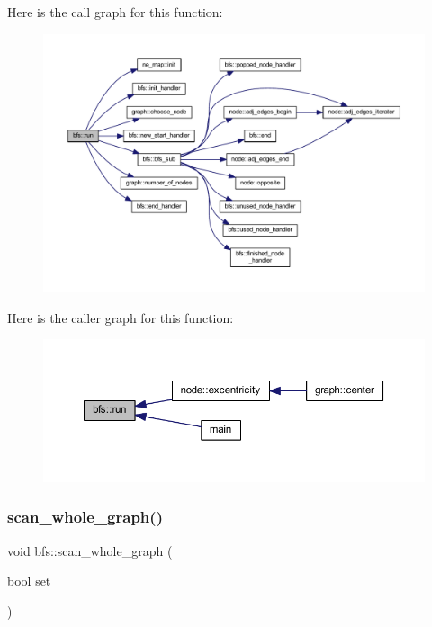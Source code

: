 Here is the call graph for this function\+:
\nopagebreak
\begin{figure}[H]
\begin{center}
\leavevmode
\includegraphics[width=350pt]{classbfs_a06ae16bd0f3bb2f8eb6b3e36659ba82e_cgraph}
\end{center}
\end{figure}
Here is the caller graph for this function\+:
\nopagebreak
\begin{figure}[H]
\begin{center}
\leavevmode
\includegraphics[width=350pt]{classbfs_a06ae16bd0f3bb2f8eb6b3e36659ba82e_icgraph}
\end{center}
\end{figure}
\mbox{\label{classbfs_a25fc51b1bfbbdd3afefe0a84c1bd2f6b}} 
\subsubsection{\texorpdfstring{scan\+\_\+whole\+\_\+graph()}{scan\_whole\_graph()}\hspace{0.1cm}{\footnotesize\ttfamily [1/2]}}
{\footnotesize\ttfamily void bfs\+::scan\+\_\+whole\+\_\+graph (\begin{DoxyParamCaption}\item[{bool}]{set }\end{DoxyParamCaption})\hspace{0.3cm}{\ttfamily [inline]}}



